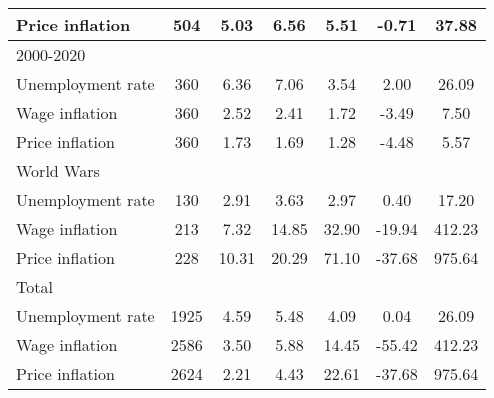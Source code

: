 \begin{table}[htbp]
\begin{tabular}{l*{1}{cccccc}}
Price inflation     &         504&        5.03&        6.56&        5.51&       -0.71&       37.88\\
\hline
2000-2020           &            &            &            &            &            &            \\
Unemployment rate   &         360&        6.36&        7.06&        3.54&        2.00&       26.09\\
Wage inflation      &         360&        2.52&        2.41&        1.72&       -3.49&        7.50\\
Price inflation     &         360&        1.73&        1.69&        1.28&       -4.48&        5.57\\
\hline
World Wars          &            &            &            &            &            &            \\
Unemployment rate   &         130&        2.91&        3.63&        2.97&        0.40&       17.20\\
Wage inflation      &         213&        7.32&       14.85&       32.90&      -19.94&      412.23\\
Price inflation     &         228&       10.31&       20.29&       71.10&      -37.68&      975.64\\
\hline
Total               &            &            &            &            &            &            \\
Unemployment rate   &        1925&        4.59&        5.48&        4.09&        0.04&       26.09\\
Wage inflation      &        2586&        3.50&        5.88&       14.45&      -55.42&      412.23\\
Price inflation     &        2624&        2.21&        4.43&       22.61&      -37.68&      975.64\\
\hline\hline
\end{tabular}
\end{table}

